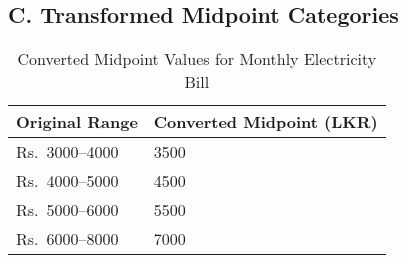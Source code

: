 \documentclass[12pt,a4paper]{article}
\begin{document}
\subsection*{C. Transformed Midpoint Categories}

\begin{table}[H]
\centering
\caption{Converted Midpoint Values for Monthly Electricity Bill}
\begin{tabular}{ll}
\toprule
\textbf{Original Range} & \textbf{Converted Midpoint (LKR)} \\
\midrule
Rs.\ 3000--4000 & 3500 \\
Rs.\ 4000--5000 & 4500 \\
Rs.\ 5000--6000 & 5500 \\
Rs.\ 6000--8000 & 7000 \\
\bottomrule
\end{tabular}
\end{table}
\end{document}
